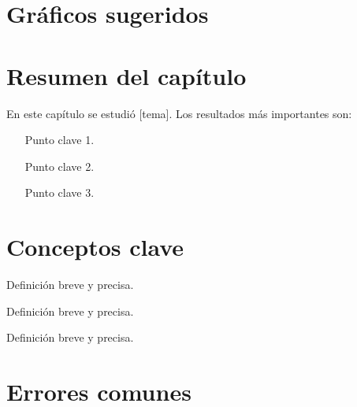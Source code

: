 \section{Gráficos sugeridos}
\label{sec:[etiqueta]-graficos}



\section{Resumen del capítulo}
\label{sec:[etiqueta]-resumen}

En este capítulo se estudió [tema]. Los resultados más importantes son:

\begin{itemize}
  \item [Punto clave 1.]
  \item [Punto clave 2.]
  \item [Punto clave 3.]
\end{itemize}

\section{Conceptos clave}
\label{sec:[etiqueta]-conceptos}

\begin{conceptosclave}
\begin{description}[leftmargin=4em, labelwidth=3.5em, font=\bfseries\color{colkey}]
  \item[Término 1]   Definición breve y precisa.
  \item[Término 2]   Definición breve y precisa.
  \item[Término 3]   Definición breve y precisa.
\end{description}
\end{conceptosclave}

\section{Errores comunes}
\label{sec:[etiqueta]-errores}

